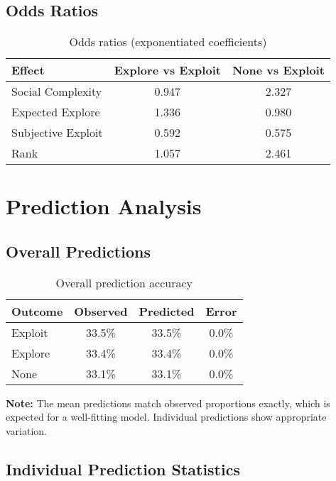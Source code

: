 \documentclass[11pt]{article}
\begin{document}
\subsection{Odds Ratios}

\begin{table}[h]
\centering
\begin{tabular}{lcc}
\toprule
\textbf{Effect} & \textbf{Explore vs Exploit} & \textbf{None vs Exploit} \\
\midrule
Social Complexity & 0.947 & 2.327 \\
Expected Explore & 1.336 & 0.980 \\
Subjective Exploit & 0.592 & 0.575 \\
Rank & 1.057 & 2.461 \\
\bottomrule
\end{tabular}
\caption{Odds ratios (exponentiated coefficients)}
\end{table}

\section{Prediction Analysis}

\subsection{Overall Predictions}

\begin{table}[h]
\centering
\begin{tabular}{lccc}
\toprule
\textbf{Outcome} & \textbf{Observed} & \textbf{Predicted} & \textbf{Error} \\
\midrule
Exploit & 33.5\% & 33.5\% & 0.0\% \\
Explore & 33.4\% & 33.4\% & 0.0\% \\
None & 33.1\% & 33.1\% & 0.0\% \\
\bottomrule
\end{tabular}
\caption{Overall prediction accuracy}
\end{table}

\textbf{Note:} The mean predictions match observed proportions exactly, which is expected for a well-fitting model. Individual predictions show appropriate variation.

\subsection{Individual Prediction Statistics}
\end{document}
